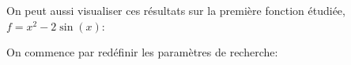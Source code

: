 {\begin{td-sol}
\begin{enumerate}
            \begin{minipage}{0.48\textwidth}
                \centering
            \end{minipage}
            \begin{minipage}{0.48\textwidth}
                \centering
            \end{minipage}
            \vspace{5pt}

            \begin{minipage}{\textwidth}
                \centering
            \end{minipage}
            \vspace{5pt}

            On peut aussi visualiser ces résultats sur la première fonction étudiée, \(f = x^2 - 2\sin(x)\):

            On commence par redéfinir les paramètres de recherche:


\end{enumerate}
\end{td-sol}}
